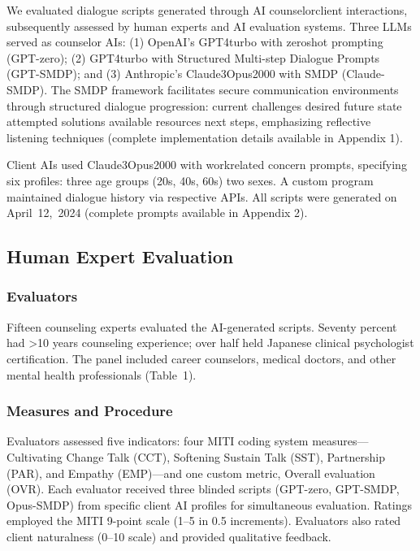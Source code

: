 \documentclass{wiley-article}
\begin{document}
We evaluated dialogue scripts generated through AI counselor\textendash{}client interactions, subsequently assessed by human experts and AI evaluation systems. Three LLMs served as counselor AIs: (1) OpenAI's GPT\textendash{}4\textendash{}turbo with zero\textendash{}shot prompting (GPT-zero); (2) GPT\textendash{}4\textendash{}turbo with Structured Multi-step Dialogue Prompts (GPT-SMDP); and (3) Anthropic's Claude\textendash{}3\textendash{}Opus\textendash{}2000 with SMDP (Claude-SMDP). The SMDP framework facilitates secure communication environments through structured dialogue progression: current challenges \textrightarrow{} desired future state \textrightarrow{} attempted solutions \textrightarrow{} available resources \textrightarrow{} next steps, emphasizing reflective listening techniques (complete implementation details available in Appendix 1).

Client AIs used Claude\textendash{}3\textendash{}Opus\textendash{}2000 with work\textendash{}related concern prompts, specifying six profiles: three age groups (20s, 40s, 60s) \texttimes{} two sexes. A custom program maintained dialogue history via respective APIs. All scripts were generated on April~12,~2024 (complete prompts available in Appendix 2).

\subsection*{Human Expert Evaluation}

\subsubsection*{Evaluators}
Fifteen counseling experts evaluated the AI-generated scripts. Seventy percent had >10 years counseling experience; over half held Japanese clinical psychologist certification. The panel included career counselors, medical doctors, and other mental health professionals (Table~1).
\subsubsection*{Measures and Procedure}
Evaluators assessed five indicators: four MITI coding system measures—Cultivating Change Talk (CCT), Softening Sustain Talk (SST), Partnership (PAR), and Empathy (EMP)—and one custom metric, Overall evaluation (OVR).
Each evaluator received three blinded scripts (GPT-zero, GPT-SMDP, Opus-SMDP) from specific client AI profiles for simultaneous evaluation. Ratings employed the MITI 9-point scale (1–5 in 0.5 increments). Evaluators also rated client naturalness (0–10 scale) and provided qualitative feedback.
\end{document}
